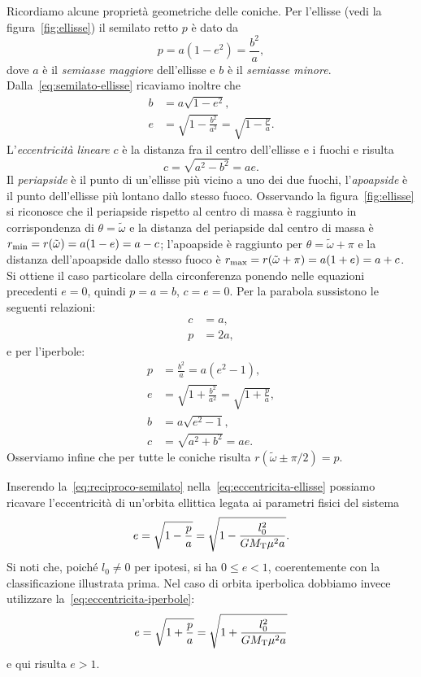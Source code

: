 Ricordiamo alcune proprietà geometriche delle coniche. Per l'ellisse (vedi la
figura~\ref{fig:ellisse}) il semilato retto $p$ è dato da
\begin{equation}
  \label{eq:semilato-ellisse}
  p = a(1-e^2) = \frac{b^2}{a},
\end{equation}
dove $a$ è il \emph{semiasse maggiore} dell'ellisse e $b$ è il \emph{semiasse
  minore}. Dalla~\eqref{eq:semilato-ellisse} ricaviamo inoltre che
\begin{align}
  b &= a\sqrt{1-e^2},\\
  e &= \sqrt{1-\frac{b^2}{a^2}} =
  \sqrt{1-\frac{p}{a}}. \label{eq:eccentricita-ellisse}
\end{align}
L'\emph{eccentricità lineare} $c$ è la distanza fra il centro dell'ellisse e i
fuochi e risulta
\begin{equation}
  c=\sqrt{a^2-b^2} = ae.
\end{equation}
Il \emph{periapside} è il punto di un'ellisse più vicino a uno dei due fuochi,
l'\emph{apoapside} è il punto dell'ellisse più lontano dallo stesso
fuoco. Osservando la figura~\ref{fig:ellisse} si riconosce che il periapside
rispetto al centro di massa è raggiunto in corrispondenza di
$\theta=\tilde\omega$ e la distanza del periapside dal centro di massa è
$r_\textup{min} = r(\tilde\omega) = a(1-e) = a-c$; l'apoapside è raggiunto per
$\theta=\tilde\omega+\pi$ e la distanza dell'apoapside dallo stesso fuoco è
$r_\textup{max} = r(\tilde\omega+\pi) = a(1+e)= a+c$. Si ottiene il caso
particolare della circonferenza ponendo nelle equazioni precedenti $e=0$, quindi
$p=a=b$, $c=e=0$. Per la parabola sussistono le seguenti relazioni:
\begin{align}
  c &= a,\\
  p &= 2a,
\end{align}
e per l'iperbole:
\begin{align}
  p &= \frac{b^2}{a} = a(e^2-1), \label{eq:semilato-iperbole}\\
  e &= \sqrt{1+\frac{b^2}{a^2}} =
  \sqrt{1+\frac{p}{a}}, \label{eq:eccentricita-iperbole}\\
  b &= a\sqrt{e^2-1}, \\
  c &= \sqrt{a^2+b^2} = ae.
\end{align}
Osserviamo infine che per tutte le coniche risulta $r(\tilde\omega\pm\pi/2)=p$.

Inserendo la~\eqref{eq:reciproco-semilato} nella~\eqref{eq:eccentricita-ellisse}
possiamo ricavare l'eccentricità di un'orbita ellittica legata ai parametri
fisici del sistema
\begin{equation}
  \label{eq:eccentricita-orbita-ellisse}
  e = \sqrt{1-\frac{p}{a}} = \sqrt{1-\frac{l_0^2}{GM_\textup{T}\mu^2a}}.
\end{equation}
Si noti che, poiché $l_0\neq 0$ per ipotesi, si ha $0\leq e<1$, coerentemente
con la classificazione illustrata prima. Nel caso di orbita iperbolica dobbiamo
invece utilizzare la~\eqref{eq:eccentricita-iperbole}:
\begin{equation}
  \label{eq:eccentricita-orbita-iperbole}
  e = \sqrt{1+\frac{p}{a}} = \sqrt{1+\frac{l_0^2}{GM_\textup{T}\mu^2a}}
\end{equation}
e qui risulta $e>1$.

